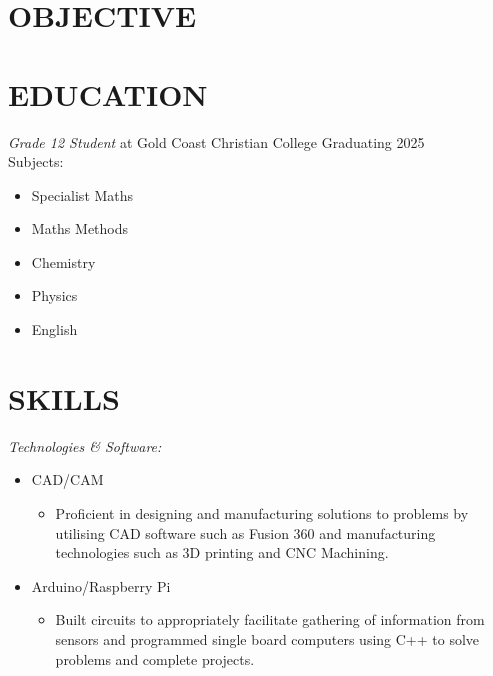 \documentclass[margin, 10pt]{res} %
\begin{document}
\begin{resume}

 
\section{OBJECTIVE}  




\section{EDUCATION}

{\sl Grade 12 Student} at Gold Coast Christian College \hfill Graduating 2025\\
Subjects:\\
\begin{itemize}
	\item Specialist Maths 
	\item Maths Methods 
	\item Chemistry  
	\item Physics  
	\item English 
\end{itemize}


 

\section{SKILLS} 

{\sl Technologies \& Software:} 
\begin{itemize}
	\item  CAD/CAM
	\begin{itemize}
		\item Proficient in designing and manufacturing solutions to problems by utilising CAD software such as Fusion 360 and manufacturing technologies such as 3D printing and CNC Machining.
	\end{itemize}
	\item Arduino/Raspberry Pi
	\begin{itemize}
		\item Built circuits to appropriately facilitate gathering of information from sensors and programmed single board computers using C++ to solve problems and complete projects.
	\end{itemize}
		

\end{itemize}
\end{resume}
\end{document}
